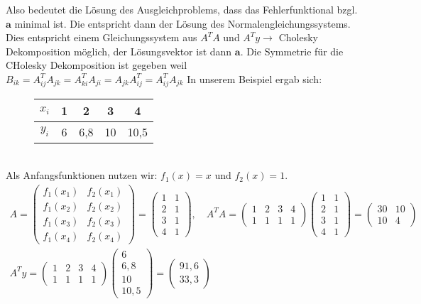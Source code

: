 \documentclass{scrartcl}
\begin{document}
Also bedeutet die Lösung des Ausgleichproblems, dass das Fehlerfunktional bzgl. $\boldsymbol{a}$ minimal ist.
Die entspricht dann der Lösung des Normalengleichungssystems.
Dies entspricht einem Gleichungssystem aus $A^T A$ und $A^T y \rightarrow$ Cholesky Dekomposition möglich, der Lösungsvektor ist dann $\boldsymbol{a}$. 
Die Symmetrie für die CHolesky Dekomposition ist gegeben weil $B_{ik}=A_{ij}^TA_{jk}=A_{ki}^T A_{ji}=A_{jk}A_{ij}^T=A_{ij}^T A_{jk}$
In unserem Beispiel ergab sich: \begin{figure}
\center

\begin{tabular}{|c||c|c|c|c|}

$x_i$ & 1 & 2 & 3 & 4 \\ 
\hline 
$y_i$ & 6 & 6,8 & 10 & 10,5 \\ 

\end{tabular}
\end{figure}\\
Als Anfangsfunktionen nutzen wir: $f_1(x)=x$ und $f_2(x)=1$.
\begin{align*}
A=\begin{pmatrix}
f_1(x_1) & f_2(x_1) \\
f_1(x_2) & f_2(x_2) \\
f_1(x_3) & f_2(x_3) \\
f_1(x_4) & f_2(x_4) 
\end{pmatrix}= \begin{pmatrix}
1 & 1\\
2 & 1\\
3 & 1\\
4 & 1
\end{pmatrix}, \quad A^T A = \begin{pmatrix}
1 & 2 & 3 & 4\\
1 & 1 & 1 & 1
\end{pmatrix} \begin{pmatrix}
1 & 1\\
2 & 1\\
3 & 1\\
4 & 1
\end{pmatrix}
=\begin{pmatrix}
30 & 10 \\
10 & 4
\end{pmatrix} \\
A^T y = \begin{pmatrix}
1 & 2 & 3 & 4\\
1 & 1 & 1 & 1
\end{pmatrix} \begin{pmatrix}
6 \\
6,8 \\
10\\
10,5
\end{pmatrix}= \begin{pmatrix}
91,6 \\
33,3
\end{pmatrix}
\end{align*}  
\end{document}
